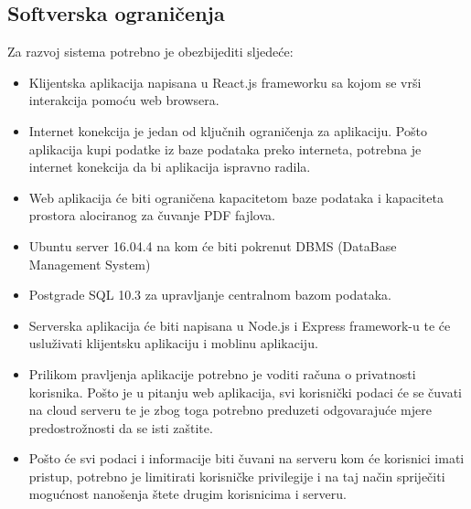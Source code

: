 \subsection{Softverska ograničenja}
Za razvoj sistema potrebno je obezbijediti sljedeće:
\begin{itemize}

\item Klijentska aplikacija napisana u React.js frameworku sa kojom se vrši interakcija pomoću web browsera.

\item Internet konekcija je jedan od ključnih ograničenja za aplikaciju. Pošto aplikacija kupi podatke iz baze podataka preko interneta, potrebna je internet konekcija da bi aplikacija ispravno radila.

\item Web aplikacija će biti ograničena kapacitetom baze podataka i kapaciteta prostora alociranog za čuvanje PDF fajlova.

\item Ubuntu server 16.04.4 na kom će biti pokrenut DBMS (DataBase Management System)

\item Postgrade SQL 10.3 za upravljanje centralnom bazom podataka.

\item Serverska aplikacija će biti napisana u Node.js i Express framework-u te će usluživati klijentsku aplikaciju i moblinu aplikaciju.

\item Prilikom pravljenja aplikacije potrebno je voditi računa o privatnosti korisnika. Pošto je u pitanju web aplikacija, svi korisnički podaci će se čuvati na cloud serveru te je zbog toga potrebno preduzeti odgovarajuće mjere predostrožnosti da se isti zaštite.

\item Pošto će svi podaci i informacije biti čuvani na serveru kom će korisnici imati pristup, potrebno je limitirati korisničke privilegije i na taj način spriječiti mogućnost nanošenja štete drugim korisnicima i serveru.
\end{itemize}


